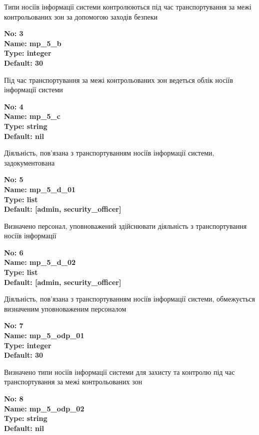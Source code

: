 \documentclass{article}
\begin{document}
{\footnotesize Типи носіїв інформації системи контролюються під час транспортування за межі контрольованих зон за допомогою заходів безпеки}


{\footnotesize\bfseries
No: 3\\
Name: mp\_\allowbreak{}5\_\allowbreak{}b\\
Type: integer\\
Default: 30
}

{\footnotesize Під час транспортування за межі контрольованих зон ведеться облік носіїв інформації системи}


{\footnotesize\bfseries
No: 4\\
Name: mp\_\allowbreak{}5\_\allowbreak{}c\\
Type: string\\
Default: nil
}

{\footnotesize Діяльність, пов'язана з транспортуванням носіїв інформації системи, задокументована}


{\footnotesize\bfseries
No: 5\\
Name: mp\_\allowbreak{}5\_\allowbreak{}d\_\allowbreak{}01\\
Type: list\\
Default: [\textquotedbl{}admin\textquotedbl{}, \textquotedbl{}security\_\allowbreak{}officer\textquotedbl{}]
}

{\footnotesize Визначено персонал, уповноважений здійснювати діяльність з транспортування носіїв інформації}


{\footnotesize\bfseries
No: 6\\
Name: mp\_\allowbreak{}5\_\allowbreak{}d\_\allowbreak{}02\\
Type: list\\
Default: [\textquotedbl{}admin\textquotedbl{}, \textquotedbl{}security\_\allowbreak{}officer\textquotedbl{}]
}

{\footnotesize Діяльність, пов'язана з транспортуванням носіїв інформації системи, обмежується визначеним уповноваженим персоналом}


{\footnotesize\bfseries
No: 7\\
Name: mp\_\allowbreak{}5\_\allowbreak{}odp\_\allowbreak{}01\\
Type: integer\\
Default: 30
}

{\footnotesize Визначено типи носіїв інформації системи для захисту та контролю під час транспортування за межі контрольованих зон}


{\footnotesize\bfseries
No: 8\\
Name: mp\_\allowbreak{}5\_\allowbreak{}odp\_\allowbreak{}02\\
Type: string\\
Default: nil
}
\end{document}
